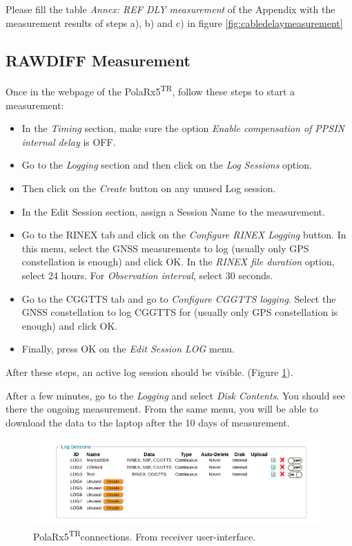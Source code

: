 \documentclass[11pt]{article}
\newcommand{\polar}[0]{PolaRx5\textsuperscript{TR}}
\begin{document}
Please fill the table \textit{Annex: REF DLY measurement} of the Appendix with the measurement results of steps a), b) and c) in figure \ref{fig:cabledelaymeasurement}



\subsection{RAWDIFF Measurement}
Once in the webpage of the \polar, follow these steps to start a measurement:

\begin{itemize}
    \item In the \textit{Timing} section, make sure the option \textit{Enable compensation of PPSIN internal delay} is OFF.
    \item Go to the \textit{Logging} section and then click on the \textit{Log Sessions} option.
    \item Then click on the \textit{Create} button on any unused Log session.
    \item In the Edit Session section, assign a Session Name to the measurement.
    \item Go to the RINEX tab and click on the \textit{Configure RINEX Logging} button. In this menu, select the GNSS measurements to log (usually only GPS constellation is enough) and click OK. In the \textit{RINEX file duration} option, select 24 hours. For \textit{Observation interval}, select 30 seconds.
    \item Go to the CGGTTS tab and go to \textit{Configure CGGTTS logging}. Select the GNSS constellation to log CGGTTS for (usually only GPS constellation is enough) and click OK.
    \item Finally, press OK on the \textit{Edit Session LOG} menu.
\end{itemize}

After these steps, an active log session should be visible. (Figure \ref{fig:screenPolar4}).

After a few minutes, go to the \textit{Logging} and select \textit{Disk Contents}. You should see there the ongoing measurement. From the same menu, you will be able to download the data to the laptop after the 10 days of measurement.  



   \begin{figure}[ht]
    \begin{center}
    \includegraphics[width=1\linewidth]{./Figures/screenPolar4.png}
    \caption{\polar connections. From receiver user-interface. } \label{fig:screenPolar4}
    \end{center}
    \end{figure}
\end{document}
